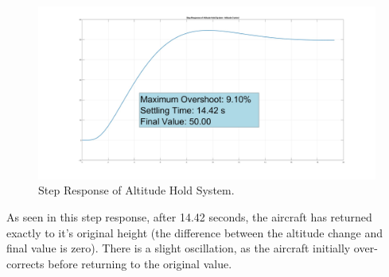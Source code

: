 \documentclass[stu, a4paper, 12pt, floatsintext]{apa7}
\numberwithin{figure}{section}
\numberwithin{table}{section}
\numberwithin{equation}{section}
\begin{document}
\begin{figure}[H]
    \caption{Step Response of Altitude Hold System.}
    \label{fig:task17_result}
    \centering
    \includegraphics[width=1.0\textwidth]{pictures/Auotpilot/Task17.jpg}
\end{figure}
As seen in this step response, after 14.42 seconds, the aircraft has returned exactly to it's original height (the difference between the altitude change and final value is zero). There is a slight oscillation, as the aircraft initially over-corrects before returning to the original value. 
\end{document}
